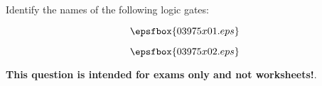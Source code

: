 

Identify the names of the following logic gates:

$$\epsfbox{03975x01.eps}$$







$$\epsfbox{03975x02.eps}$$







{\bf This question is intended for exams only and not worksheets!}.





